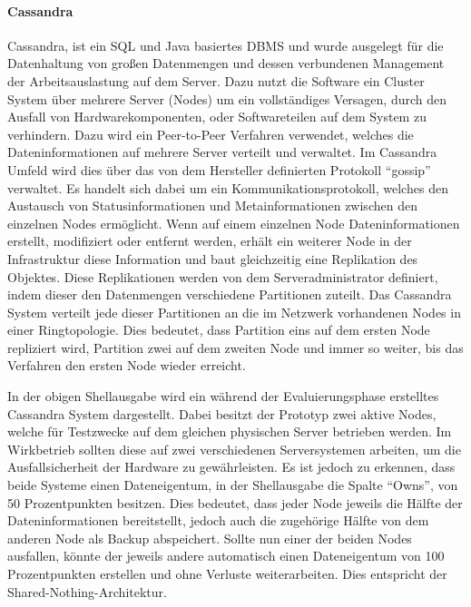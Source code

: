 \paragraph{Cassandra}
\label{paragraph:cassandra}
Cassandra, ist ein \gls{SQL} und Java basiertes \gls{DBMS} und wurde ausgelegt
für die Datenhaltung von großen Datenmengen und dessen verbundenen
Management der Arbeitsauslastung auf dem Server. Dazu nutzt die Software ein
Cluster System über mehrere Server (Nodes) um ein vollständiges Versagen, durch
den Ausfall von Hardwarekomponenten, oder Softwareteilen auf dem System zu
verhindern. Dazu wird ein \gls{Peer-to-Peer} Verfahren verwendet, welches die
Dateninformationen auf mehrere Server verteilt und verwaltet. Im Cassandra
Umfeld wird dies über das von dem Hersteller definierten Protokoll ``gossip''
verwaltet. Es handelt sich dabei um ein Kommunikationsprotokoll, welches den
Austausch von Statusinformationen und Metainformationen zwischen den einzelnen
Nodes ermöglicht. Wenn auf einem einzelnen Node Dateninformationen erstellt,
modifiziert oder entfernt werden, erhält ein weiterer Node in der Infrastruktur
diese Information und baut gleichzeitig eine Replikation des Objektes. Diese
Replikationen werden von dem Serveradministrator definiert, indem dieser den
Datenmengen verschiedene \gls{Partitionen} zuteilt. Das Cassandra System
verteilt jede dieser \gls{Partitionen} an die im Netzwerk vorhandenen Nodes
in einer \gls{Ringtopologie}. Dies bedeutet, dass Partition eins auf dem ersten
Node repliziert wird, Partition zwei auf dem zweiten Node und immer so weiter,
bis das Verfahren den ersten Node wieder erreicht.



In der obigen Shellausgabe wird ein während der Evaluierungsphase erstelltes
Cassandra System dargestellt. Dabei besitzt der Prototyp zwei aktive Nodes,
welche für Testzwecke auf dem gleichen physischen Server betrieben werden. Im
Wirkbetrieb sollten diese auf zwei verschiedenen Serversystemen arbeiten, um
die Ausfallsicherheit der Hardware zu gewährleisten. Es ist jedoch zu erkennen,
dass beide Systeme einen Dateneigentum, in der Shellausgabe die Spalte
``Owns'', von 50 Prozentpunkten besitzen. Dies bedeutet, dass jeder Node
jeweils die Hälfte der Dateninformationen bereitstellt, jedoch auch die
zugehörige Hälfte von dem anderen Node als Backup abspeichert. Sollte nun
einer der beiden Nodes ausfallen, könnte der jeweils andere automatisch
einen Dateneigentum von 100 Prozentpunkten erstellen und ohne Verluste
weiterarbeiten. Dies entspricht der \gls{Shared-Nothing-Architektur}.

